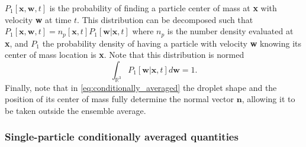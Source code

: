 $P_1[\textbf{x},\textbf{w},t]$ is the probability of finding a particle center of mass at \textbf{x} with velocity \textbf{w} at time $t$.
This distribution can be decomposed such that $P_1[\textbf{x},\textbf{w},t] = n_p[\textbf{x},t] P_1[\textbf{w}|\textbf{x},t]$ where $n_p$ is the number density evaluated at \textbf{x}, and $P_1$ the probability density of having a particle with velocity \textbf{w} knowing its center of mass location is \textbf{x}. 
Note that this distribution is normed 
\begin{equation*}
    \int_{\mathbb{R}^3} P_1[\textbf{w}|\textbf{x},t] d \textbf{w} = 1. 
\end{equation*}
Finally, note that in \ref{eq:conditionally_averaged} the droplet shape and the position of its center of mass fully determine the normal vector $\textbf{n}$, allowing it to be taken outside the ensemble average. 


\subsubsection{Single-particle conditionally averaged quantities}

